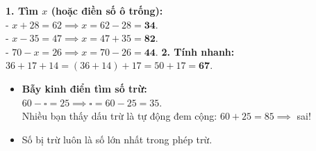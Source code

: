 \documentclass[11pt,a4paper]{article}
\begin{document}
\vspace{-1.5mm}
\noindent
\begin{minipage}[t]{0.49\textwidth}\vspace{0pt}
\begin{tcolorbox}[
  enhanced,
  colback=green!4!white,
  colframe=green!60!black,
  arc=2mm, boxrule=0.8pt,
  left=2mm, right=2mm, top=1.8mm, bottom=1.8mm,
  title={\footnotesize\bfseries\color{white}\faCheckCircle\ 4. Ví dụ thực hành chuẩn mực}
]
{\footnotesize
\textbf{1. Tìm $x$ (hoặc điền số ô trống):}\\
- $x + 28 = 62 \implies x = 62 - 28 = \mathbf{34}$.\\
- $x - 35 = 47 \implies x = 47 + 35 = \mathbf{82}$.\\
- $70 - x = 26 \implies x = 70 - 26 = \mathbf{44}$.
\textbf{2. Tính nhanh:}\\
$36 + 17 + 14 = (36 + 14) + 17 = 50 + 17 = \mathbf{67}$.
}
\end{tcolorbox}
\end{minipage}
\hfill
\begin{minipage}[t]{0.49\textwidth}\vspace{0pt}
\begin{tcolorbox}[
  enhanced,
  colback=red!4!white,
  colframe=red!75!black,
  arc=2mm, boxrule=0.8pt,
  left=2mm, right=2mm, top=1.8mm, bottom=1.8mm,
  title={\footnotesize\bfseries\color{white}\faExclamationTriangle\ 5. Mẹo tránh bẫy trắc nghiệm}
]
{\footnotesize
\begin{itemize}\setlength{\itemsep}{1pt}\setlength{\leftskip}{-2.5mm}
  \item \textbf{Bẫy kinh điển tìm số trừ:}\\
  $60 - \square = 25 \implies \square = 60 - 25 = 35$.\\
  Nhiều bạn thấy dấu trừ là tự động đem cộng: $60 + 25 = 85 \implies$ sai!
  \item Số bị trừ luôn là số lớn nhất trong phép trừ.
\end{itemize}
}
\end{tcolorbox}
\end{minipage}
\end{document}
